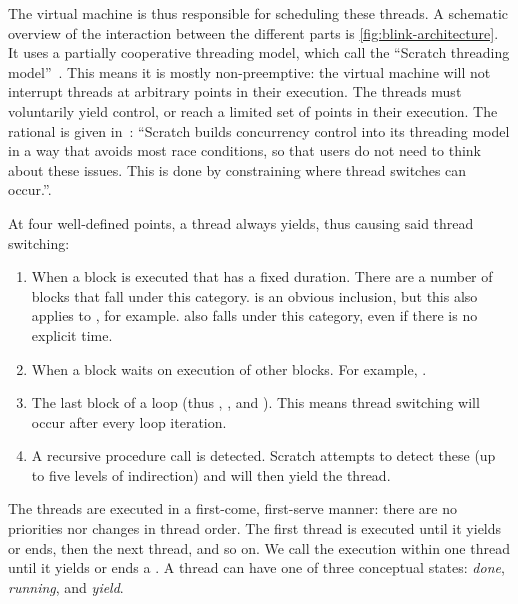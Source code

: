 \documentclass[../main]{subfiles}
\begin{document}
The virtual machine is thus responsible for scheduling these threads.
A schematic overview of the interaction between the different parts is \cref{fig:blink-architecture}.
It uses a partially cooperative threading model, which \citeauthor{maloneyScratchProgrammingLanguage2010a} call the ``Scratch threading model''~\autocite{maloneyScratchProgrammingLanguage2010a}.
This means it is mostly non-preemptive: the virtual machine will not interrupt threads at arbitrary points in their execution.
The threads must voluntarily yield control, or reach a limited set of points in their execution.
The rational is given in~\autocite{maloneyScratchProgrammingLanguage2010a}: ``Scratch builds concurrency control into its threading model in a way that avoids most race conditions, so that users do not need to think about these issues.
This is done by constraining where thread switches can occur.''.

At four well-defined points, a thread always yields, thus causing said thread switching:
\begin{enumerate}
    \item When a block is executed that has a fixed duration.
        There are a number of blocks that fall under this category.
         is an obvious inclusion, but this also applies to , for example.
         also falls under this category, even if there is no explicit time.
    \item When a block waits on execution of other blocks.
        For example, .
    \item The last block of a loop (thus , , and ).
        This means thread switching will occur after every loop iteration.
    \item A recursive procedure call is detected.
        Scratch attempts to detect these (up to five levels of indirection) and will then yield the thread.
\end{enumerate}

The threads are executed in a first-come, first-serve manner: there are no priorities nor changes in thread order.
The first thread is executed until it yields or ends, then the next thread, and so on.
We call the execution within one thread until it yields or ends a .
A thread can have one of three conceptual states: \emph{done}, \emph{running}, and \emph{yield}.
\end{document}

